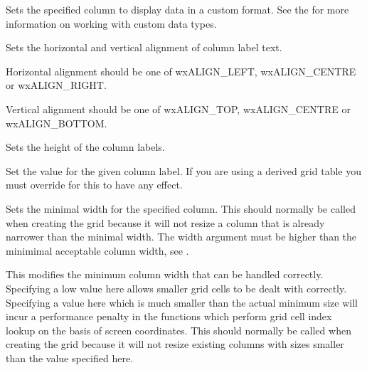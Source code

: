 Sets the specified column to display data in a custom format.
See the  for more information on working
with custom data types.

\label{wxgridsetcollabelalignment}


Sets the horizontal and vertical alignment of column label text.

Horizontal alignment should be one of wxALIGN\_LEFT, wxALIGN\_CENTRE or wxALIGN\_RIGHT.

Vertical alignment should be one of wxALIGN\_TOP, wxALIGN\_CENTRE or wxALIGN\_BOTTOM.

\label{wxgridsetcollabelsize}


Sets the height of the column labels.

\label{wxgridsetcollabelvalue}


Set the value for the given column label. If you are using a derived grid table you must 
override 
for this to have any effect.

\label{wxgridsetcolminimalwidth}


Sets the minimal width for the specified column. This should normally be called when creating the grid
because it will not resize a column that is already narrower than the minimal width.
The width argument must be higher than the minimimal acceptable column width, see
.

\label{wxgridsetcolminimalacceptablewidth}


This modifies the minimum column width that can be handled correctly. Specifying a low value here
allows smaller grid cells to be dealt with correctly. Specifying a value here which is much smaller
than the actual minimum size will incur a performance penalty in the functions which perform
grid cell index lookup on the basis of screen coordinates.
This should normally be called when creating the grid because it will not resize existing columns
with sizes smaller than the value specified here. 

